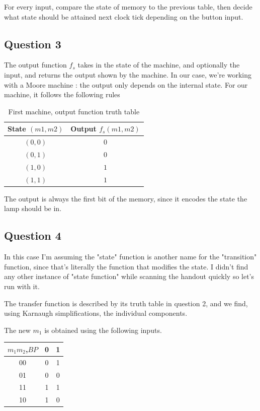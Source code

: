 \documentclass[a4paper,10pt]{article}
\begin{document}
For every input, compare the state of memory to the previous table, then decide what state should be attained next clock tick depending on the button input.

\subsection{Question 3}

The output function $f_s$ takes in the state of the machine, and optionally the input, and returns the output shown by the machine. In our case, we're working with a Moore machine : the output only depends on the internal state. For our machine, it follows the following rules

\begin{table}[ht!]
	\centering
	\begin{tabular}{|c|c|}
		\hline
		State $(m1,m2)$&Output $f_s(m1,m2)$\\\hline
		$(0,0)$&$0$\\\hline
		$(0,1)$&$0$\\\hline
		$(1,0)$&$1$\\\hline
		$(1,1)$&$1$\\\hline
	\end{tabular}
	\caption{First machine, output function truth table}
\end{table}

The output is always the first bit of the memory, since it encodes the state the lamp should be in.

\subsection{Question 4}

In this case I'm assuming the "state" function is another name for the "transition" function, since that's literally the function that modifies the state. I didn't find any other instance of "state function" while scanning the handout quickly so let's run with it.

The transfer function is described by its truth table in question 2, and we find, using Karnaugh simplifications, the individual components.

The new $m_1$ is obtained using the following inputs.
\begin{table}[ht!]
	\centering
	\begin{tabular}{|c|c|c|}
		\hline
		$m_1m_2$,$BP$&0&1\\\hline
		00&0&1\\\hline
		01&0&0\\\hline
		11&1&1\\\hline
		10&1&0\\\hline
	\end{tabular}
\end{table}
\end{document}
